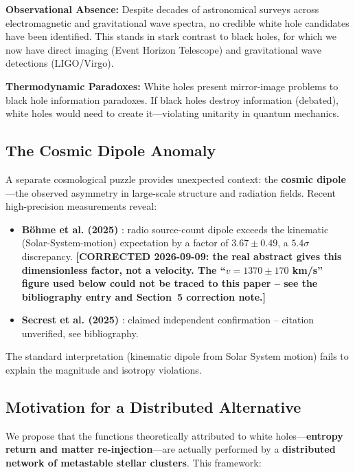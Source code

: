 \documentclass[11pt,a4paper,twocolumn]{article}
\begin{document}
\textbf{Observational Absence:} Despite decades of astronomical surveys across electromagnetic and gravitational wave spectra, no credible white hole candidates have been identified. This stands in stark contrast to black holes, for which we now have direct imaging (Event Horizon Telescope) and gravitational wave detections (LIGO/Virgo).

\textbf{Thermodynamic Paradoxes:} White holes present mirror-image problems to black hole information paradoxes. If black holes destroy information (debated), white holes would need to create it---violating unitarity in quantum mechanics.

\subsection{The Cosmic Dipole Anomaly}

A separate cosmological puzzle provides unexpected context: the \textbf{cosmic dipole}---the observed asymmetry in large-scale structure and radiation fields. Recent high-precision measurements reveal:

\begin{itemize}
    \item \textbf{Böhme et al. (2025)} \citep{bohme2025}: radio source-count dipole exceeds the kinematic (Solar-System-motion) expectation by a factor of $3.67 \pm 0.49$, a $5.4\sigma$ discrepancy. \textbf{[CORRECTED 2026-09-09: the real abstract gives this dimensionless factor, not a velocity. The ``$v=1370\pm170$ km/s'' figure used below could not be traced to this paper -- see the bibliography entry and Section~5 correction note.]}
    \item \textbf{Secrest et al. (2025)} \citep{secrest2025}: claimed independent confirmation -- citation unverified, see bibliography.
\end{itemize}

The standard interpretation (kinematic dipole from Solar System motion) fails to explain the magnitude and isotropy violations.

\subsection{Motivation for a Distributed Alternative}

We propose that the functions theoretically attributed to white holes---\textbf{entropy return and matter re-injection}---are actually performed by a \textbf{distributed network of metastable stellar clusters}. This framework:
\end{document}
